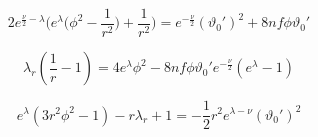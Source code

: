 \documentclass[12pt]{article}
\begin{document}
\begin{equation}
  2e^{\frac{\nu}{2} - \lambda} \Big( e^{\lambda} \big(\phi^2 - \frac{1}{r^2} \big) + \frac{1}{r^2}\Big) = e^{-\frac{\nu}{2}}(\vartheta_0')^2 + 8 nf\phi\vartheta_0'
\end{equation}

\begin{equation}
  \lambda_r \left(\frac{1}{r} - 1 \right) = 4 e^{\lambda}\phi^2 - 8nf\phi\vartheta_0' e^{-\frac{\nu}{2}}\left(e^{\lambda} -  1\right)
\end{equation}

\begin{equation}
  e^{\lambda}(3r^2\phi^2 - 1) - r\lambda_r + 1 = - \frac{1}{2} r^2 e^{\lambda-\nu} (\vartheta_0')^2
\end{equation}
\end{document}
